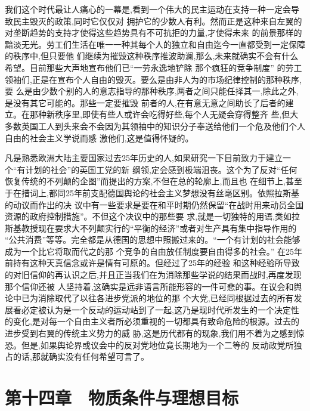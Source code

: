 ﻿\documentclass[12pt]{article}
\begin{document}
我们这个时代最让人痛心的一幕是,看到一个伟大的民主运动在支持一种一定会导致民主毁灭的政策,同时它仅仅对
拥护它的少数人有利。然而正是这种来自左翼的对垄断趋势的支持才使得这些趋势具有不可抗拒的力量,才使得未来
的前景那样的黯淡无光。劳工们生活在唯一一种其每个人的独立和自由迄今一直都受到一定保障的秩序中,但只要他
们继续为摧毁这种秩序推波助澜,那么,未来就确实不会有什么希望。目前那些大声地宣布他们已``一劳永逸地铲除
那个疯狂的竞争制度'' 的劳工领袖们,正是在宣布个人自由的毁灭。要么是由非人为的市场纪律控制的那种秩序,要
么是由少数个别的人的意志指导的那种秩序,两者之间只能任择其一,除此之外,是没有其它可能的。那些一定要摧毁
前者的人,在有意无意之间助长了后者的建立。在那种新秩序里,即使有些人或许会吃得好些,每个人无疑会穿得整齐
些,但大多数英国工人到头来会不会因为其领袖中的知识分子奉送给他们一个危及他们个人自由的社会主义学说而感
激他们,这是值得怀疑的。

凡是熟悉欧洲大陆主要国家过去25年历史的人,如果研究一下目前致力于建立一个``有计划的社会''的英国工党的新
纲领,定会感到极端沮丧。这个为了反对``任何恢复传统的不列颠的企图''而提出的方案,不但在总的轮廓上,而且也
在细节上,甚至于在措词上,都同25年前支配德国舆论的社会主义梦想没有丝毫区别。依照拉斯基的动议而作出的决
议中有一些要求是要在和平时期仍然保留``在战时用来动员全国资源的政府控制措施''。不但这个决议中的那些要
求,就是一切独特的用语,类如拉斯基教授现在要求大不列颠实行的``平衡的经济''或者对生产具有集中指导作用的
``公共消费''等等。完全都是从德国的思想中照搬过来的。``一个有计划的社会能够成为一个比它将取而代之的那
个竞争的自由放任制度要自由得多的社会。'' 在25年前持有这种天真信念或许是情有可原的。但经过了25年的经验
和这种经验所导致的对旧信仰的再认识之后,并且正当我们在为消除那些学说的结果而战时,再度发现那个信仰还被
人坚持着,这确实是远非语言所能形容的一件可悲的事。在议会和舆论中已为消除取代了以往各进步党派的地位的那
个大党,已经同根据过去的所有发展看必定被认为是一个反动的运动站到了一起,这乃是现时代所发生的一个决定性
的变化,是对每一个自由主义者所必须重视的一切都具有致命危险的根源。过去的进步受到右翼的传统主义势力的威
胁,这是历代都有的现象,我们用不着为之感到惊恐。但是,如果舆论界或议会中的反对党地位竟长期地为一个二等的
反动政党所独占的话,那就确实没有任何希望可言了。



\section{第十四章　物质条件与理想目标}

\end{document}
